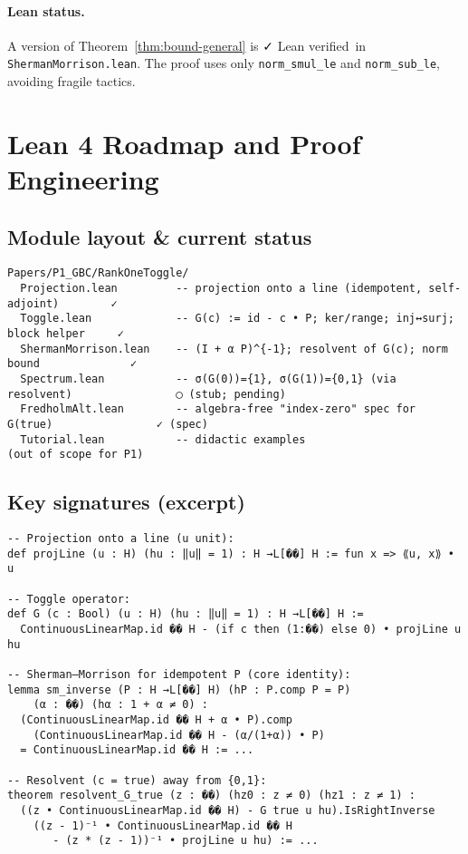 \documentclass[11pt]{article}
\theoremstyle{definition}
\newcommand{\leanok}{\textsf{\small \textcolor{green!60!black}{✓ Lean verified}}}
\begin{document}
\paragraph{Lean status.} A version of Theorem~\ref{thm:bound-general} is \leanok\ in \texttt{ShermanMorrison.lean}. The proof uses only \texttt{norm\_smul\_le} and \texttt{norm\_sub\_le}, avoiding fragile tactics.

\section{Lean 4 Roadmap and Proof Engineering}\label{sec:lean}

\subsection*{Module layout \& current status}
\begin{verbatim}
Papers/P1_GBC/RankOneToggle/
  Projection.lean         -- projection onto a line (idempotent, self-adjoint)        ✓
  Toggle.lean             -- G(c) := id - c • P; ker/range; inj↔surj; block helper     ✓
  ShermanMorrison.lean    -- (I + α P)^{-1}; resolvent of G(c); norm bound              ✓
  Spectrum.lean           -- σ(G(0))={1}, σ(G(1))={0,1} (via resolvent)                ◯ (stub; pending)
  FredholmAlt.lean        -- algebra-free "index-zero" spec for G(true)                ✓ (spec)
  Tutorial.lean           -- didactic examples                                         (out of scope for P1)
\end{verbatim}

\subsection*{Key signatures (excerpt)}
\begin{lstlisting}
-- Projection onto a line (u unit):
def projLine (u : H) (hu : ‖u‖ = 1) : H →L[��] H := fun x => ⟪u, x⟫ • u

-- Toggle operator:
def G (c : Bool) (u : H) (hu : ‖u‖ = 1) : H →L[��] H :=
  ContinuousLinearMap.id �� H - (if c then (1:��) else 0) • projLine u hu

-- Sherman–Morrison for idempotent P (core identity):
lemma sm_inverse (P : H →L[��] H) (hP : P.comp P = P)
    (α : ��) (hα : 1 + α ≠ 0) :
  (ContinuousLinearMap.id �� H + α • P).comp
    (ContinuousLinearMap.id �� H - (α/(1+α)) • P)
  = ContinuousLinearMap.id �� H := ...

-- Resolvent (c = true) away from {0,1}:
theorem resolvent_G_true (z : ��) (hz0 : z ≠ 0) (hz1 : z ≠ 1) :
  ((z • ContinuousLinearMap.id �� H) - G true u hu).IsRightInverse
    ((z - 1)⁻¹ • ContinuousLinearMap.id �� H
       - (z * (z - 1))⁻¹ • projLine u hu) := ...
\end{lstlisting}
\end{document}
